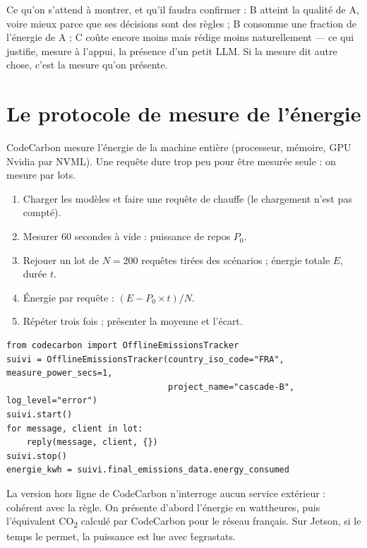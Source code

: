 Ce qu'on s'attend à montrer, et qu'il faudra confirmer : B atteint la qualité de A, voire mieux
parce que ses décisions sont des règles ; B consomme une fraction de l'énergie de A ; C coûte
encore moins mais rédige moins naturellement --- ce qui justifie, mesure à l'appui, la présence
d'un petit LLM. Si la mesure dit autre chose, c'est la mesure qu'on présente.

\section{Le protocole de mesure de l'énergie}
\label{sec:energie}

CodeCarbon mesure l'énergie de la machine entière (processeur, mémoire, GPU Nvidia par NVML). Une
requête dure trop peu pour être mesurée seule : on mesure par lots.

\begin{enumerate}
  \item Charger les modèles et faire une requête de chauffe (le chargement n'est pas compté).
  \item Mesurer 60 secondes à vide : puissance de repos $P_0$.
  \item Rejouer un lot de $N = 200$ requêtes tirées des scénarios ; énergie totale $E$, durée $t$.
  \item Énergie par requête : $(E - P_0 \times t) / N$.
  \item Répéter trois fois ; présenter la moyenne et l'écart.
\end{enumerate}

\begin{code}
\footnotesize
\begin{verbatim}
from codecarbon import OfflineEmissionsTracker
suivi = OfflineEmissionsTracker(country_iso_code="FRA", measure_power_secs=1,
                                project_name="cascade-B", log_level="error")
suivi.start()
for message, client in lot:
    reply(message, client, {})
suivi.stop()
energie_kwh = suivi.final_emissions_data.energy_consumed
\end{verbatim}
\end{code}

La version \og hors ligne \fg{} de CodeCarbon n'interroge aucun service extérieur : cohérent avec
la règle. On présente d'abord l'énergie en wattheures, puis l'équivalent CO\textsubscript{2}
calculé par CodeCarbon pour le réseau français. Sur Jetson, si le temps le permet, la puissance est
lue avec \f{tegrastats}.
